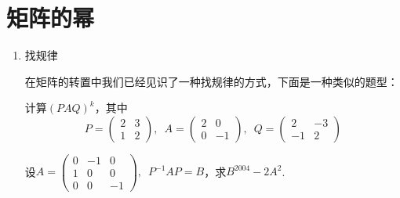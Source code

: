\section{矩阵的幂}
\begin{enumerate}
    \item 找规律

    在矩阵的转置中我们已经见识了一种找规律的方式，下面是一种类似的题型：
    \begin{example}
        计算$(PAQ)^k$，其中
        \[P=\begin{pmatrix}2 & 3 \\ 1 & 2\end{pmatrix},\enspace A=\begin{pmatrix}2 & 0 \\ 0 & -1\end{pmatrix},\enspace Q=\begin{pmatrix}2 & -3 \\ -1 & 2\end{pmatrix}\]
    \end{example}

    \begin{example}
        设$A=\begin{pmatrix}0 & -1 & 0 \\ 1 & 0 & 0 \\ 0 & 0 & -1 \end{pmatrix},\enspace P^{-1}AP=B$，求$B^{2004}-2A^2$.
    \end{example}


\end{enumerate}
